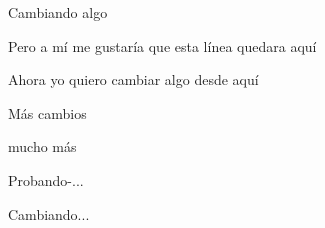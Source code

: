 \documentclass{article}
\begin{document}
Cambiando algo


Pero a mí me gustaría que esta línea quedara aquí

Ahora yo quiero cambiar algo desde aquí

Más cambios

mucho más

Probando-...

Cambiando...
\end{document}
